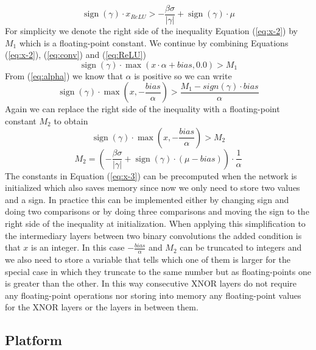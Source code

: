 \documentclass[conference]{IEEEtran}
\DeclareMathOperator{\sign}{sign}
\begin{document}
\begin{equation}
\sign(\gamma)\cdot x_{\mathit{ReLU}} > -\frac{\beta\sigma}{\lvert\gamma\rvert}+\sign(\gamma)\cdot\mu
\label{eq:x-2}
\end{equation}
For simplicity we denote the right side of the inequality Equation (\ref{eq:x-2}) by $M_1$ which is a floating-point constant. We continue by combining Equations (\ref{eq:x-2}), (\ref{eq:conv}) and (\ref{eq:ReLU})
\begin{equation}
\sign(\gamma)\cdot\max(x\cdot\alpha+\mathit{bias}, 0.0) > M_1
\end{equation}
From (\ref{eq:alpha}) we know that $\alpha$ is positive so we can write
\begin{equation}
\sign(\gamma)\cdot\max(x, -\frac{\mathit{bias}}{\alpha}) > \frac{M_1-sign(\gamma)\cdot\mathit{bias}}{\alpha}
\end{equation}
Again we can replace the right side of the inequality with a floating-point constant $M_2$ to obtain
\begin{equation}
\sign(\gamma)\cdot\max(x, -\frac{\mathit{bias}}{\alpha}) > M_2
\label{eq:x-3}
\end{equation}
\begin{equation}
M_2 = (-\frac{\beta\sigma}{\lvert\gamma\rvert}+\sign(\gamma)\cdot(\mu-\mathit{bias}))\cdot\frac{1}{\alpha}
\end{equation}
The constants in Equation (\ref{eq:x-3}) can be precomputed when the network is initialized which also saves memory since now we only need to store two values and a sign. In practice this can be implemented either by changing sign and doing two comparisons or by doing three comparisons and moving the sign to the right side of the inequality at initialization. When applying this simplification to the intermediary layers between two binary convolutions the added condition is that $x$ is an integer. In this case $-\frac{\mathit{bias}}{\alpha}$ and $M_2$ can be truncated to integers and we also need to store a variable that tells which one of them is larger for the special case in which they truncate to the same number but as floating-points one is greater than the other. In this way consecutive XNOR layers do not require any floating-point operations nor storing into memory any floating-point values for the XNOR layers or the layers in between them.

\subsection{Platform}
\label{sec:platform}
\end{document}
